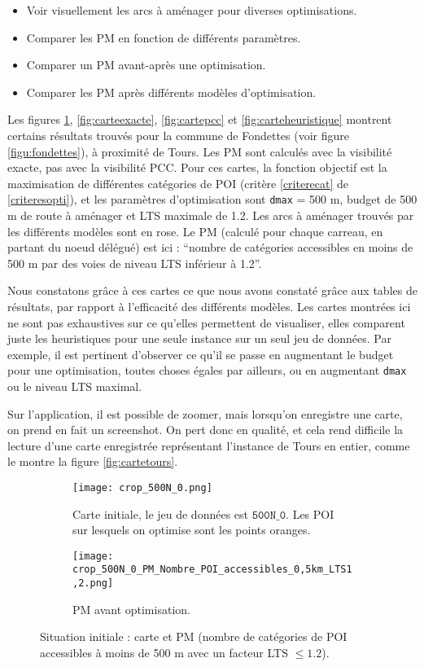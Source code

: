 \begin{itemize}
    \item Voir visuellement les arcs à aménager pour diverses optimisations.
    \item Comparer les PM en fonction de différents paramètres.
    \item Comparer un PM avant-après une optimisation.
    \item Comparer les PM après différents modèles d'optimisation.
\end{itemize}

Les figures \ref{fig:carteinitiale}, \ref{fig:carteexacte}, \ref{fig:cartepcc} et \ref{fig:carteheuristique} montrent certains résultats trouvés pour la commune de Fondettes (voir figure \ref{figu:fondettes}), à proximité de Tours. Les PM sont calculés avec la visibilité exacte, pas avec la visibilité PCC. Pour ces cartes, la fonction objectif est la maximisation de différentes catégories de POI (critère \ref{criterecat} de \ref{criteresopti}), et les paramètres d'optimisation sont \verb|dmax| = 500 m, budget de 500 m de route à aménager et LTS maximale de 1.2. Les arcs à aménager trouvés par les différents modèles sont en rose. Le PM (calculé pour chaque carreau, en partant du noeud délégué) est ici : ``nombre de catégories accessibles en moins de 500 m par des voies de niveau LTS inférieur à 1.2''.

Nous constatons grâce à ces cartes ce que nous avons constaté grâce aux tables de résultats, par rapport à l'efficacité des différents modèles. Les cartes montrées ici ne sont pas exhaustives sur ce qu'elles permettent de visualiser, elles comparent juste les heuristiques pour une seule instance sur un seul jeu de données. Par exemple, il est pertinent d'observer ce qu'il se passe en augmentant le budget pour une optimisation, toutes choses égales par ailleurs, ou en augmentant \verb|dmax| ou le niveau LTS maximal.

Sur l'application, il est possible de zoomer, mais lorsqu'on enregistre une carte, on prend en fait un screenshot. On pert donc en qualité, et cela rend difficile la lecture d'une carte enregistrée représentant l'instance de Tours en entier, comme le montre la figure \ref{fig:cartetours}.

\begin{figure}[H]
    \centering
    \begin{subfigure}[t]{0.45\textwidth}
        \centering
        \texttt{[image: crop\_500N\_0.png]}
        \caption{Carte initiale, le jeu de données est $\texttt{500N\_0}$. Les POI sur lesquels on optimise sont les points oranges.}
    \end{subfigure}
    \hfill
    \begin{subfigure}[t]{0.45\textwidth}
        \centering
        \texttt{[image: crop\_500N\_0\_PM\_Nombre\_POI\_accessibles\_0,5km\_LTS1,2.png]}
        \caption{PM avant optimisation.}
    \end{subfigure}
    \caption{Situation initiale : carte et PM (nombre de catégories de POI accessibles à moins de 500 m avec un facteur LTS $\leq 1.2$).}
    \label{fig:carteinitiale}
\end{figure}

